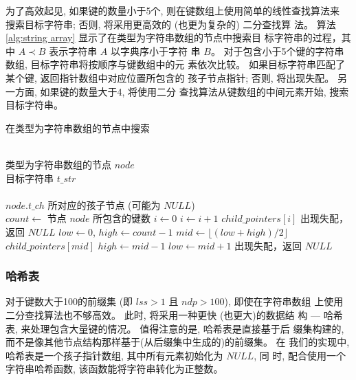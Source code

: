 为了高效起见, 如果键的数量小于5个, 则在键数组上使用简单的线性查找算法来
搜索目标字符串; 否则, 将采用更高效的 (也更为复杂的) 二分查找算
法。 算法 \ref{alg:string array} 显示了在类型为字符串数组的节点中搜索目
标字符串的过程，其中 $A \prec B$ 表示字符串 $A$ 以字典序小于字符
串 $B$。 对于包含小于5个键的字符串数组, 目标字符串将按顺序与键数组中的元
素依次比较。 如果目标字符串匹配了某个键, 返回指针数组中对应位置所包含的
孩子节点指针; 否则, 将出现失配。 另一方面, 如果键的数量大于4, 将使用二分
查找算法从键数组的中间元素开始, 搜索目标字符串。

\begin{algorithm}
  \caption{在类型为字符串数组的节点中搜索}
  \label{alg:string array}
  \begin{algorithmic}[1]
    \REQUIRE ~~\\
    类型为字符串数组的节点 $node$ \\
    目标字符串 $t\_str$\\
    \ENSURE ~~\\
     $node.t\_ch$ 所对应的孩子节点 (可能为 $NULL$)\\
    \STATE
    \STATE $count \leftarrow$ 节点 $node$  所包含的键数
    \STATE
    \STATE $i \leftarrow 0$
    \STATE $i \leftarrow i+1$
    \ENDWHILE
    \RETURN $child\_pointers[i]$
    \ELSE
    \STATE 出现失配，返回 $NULL$
    \ENDIF
    \ELSE
    \STATE $low \leftarrow 0$, $high \leftarrow count-1$
    \STATE $mid \leftarrow \lfloor (low+high)/2 \rfloor$
    \RETURN $child\_pointers[mid]$
    \STATE $high \leftarrow mid - 1$
    \ELSE
    \STATE $low \leftarrow mid + 1$
    \ENDIF
    \ENDWHILE
    \STATE 出现失配，返回 $NULL$
    \ENDIF
  \end{algorithmic}
\end{algorithm}

\subsubsection{哈希表}
\label{sec:hash table}

对于键数大于100的前缀集 (即 $lss > 1$ 且 $ndp > 100$), 即使在字符串数组
上使用二分查找算法也不够高效。 此时, 将采用一种更快 (也更大)的数据结
构 --- 哈希表, 来处理包含大量键的情况。 值得注意的是, 哈希表是直接基于后
缀集构建的, 而不是像其他节点结构那样基于(从后缀集中生成的)的前缀集。 在
我们的实现中, 哈希表是一个孩子指针数组, 其中所有元素初始化为 $NULL$, 同
时, 配合使用一个字符串哈希函数, 该函数能将字符串转化为正整数。

